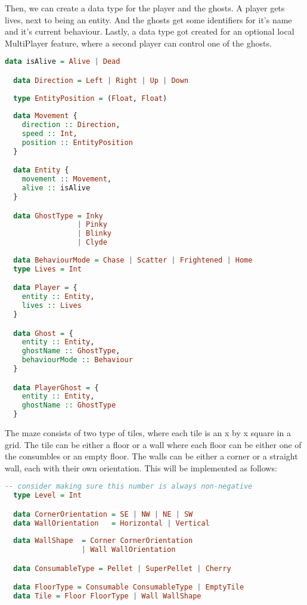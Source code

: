 \documentclass[11pt]{Article}
\begin{document}
Then, we can create a data type for the player and the ghosts. A player gets lives, next to being an entity. And the ghosts get some identifiers for it's name and it's current behaviour. Lastly, a data type got created for an optional local MultiPlayer feature, where a second player can control one of the ghosts.

\begin{lstlisting}[language=Haskell]
  data isAlive = Alive | Dead

  data Direction = Left | Right | Up | Down
  
  type EntityPosition = (Float, Float)
  
  data Movement {
    direction :: Direction,
    speed :: Int,
    position :: EntityPosition
  }

  data Entity {
    movement :: Movement,
    alive :: isAlive
  }

  data GhostType = Inky 
                 | Pinky 
                 | Blinky 
                 | Clyde 
  
  data BehaviourMode = Chase | Scatter | Frightened | Home
  type Lives = Int

  data Player = {
    entity :: Entity,
    lives :: Lives
  }

  data Ghost = {
    entity :: Entity,
    ghostName :: GhostType,
    behaviourMode :: Behaviour
  }

  data PlayerGhost = {
    entity :: Entity,
    ghostName :: GhostType
  }
\end{lstlisting}

\noindent The maze consists of two type of tiles, where each tile is an x by x square in a grid. The tile can be either a floor or a wall where each floor can be either one of the consumbles or an empty floor. The walls can be either a corner or a straight wall, each with their own orientation. This will be implemented as follows:
\begin{lstlisting}[language=Haskell]
  -- consider making sure this number is always non-negative
  type Level = Int

  data CornerOrientation = SE | NW | NE | SW
  data WallOrientation   = Horizontal | Vertical
  
  data WallShape  = Corner CornerOrientation
                  | Wall WallOrientation 

  data ConsumableType = Pellet | SuperPellet | Cherry

  data FloorType = Consumable ConsumableType | EmptyTile
  data Tile = Floor FloorType | Wall WallShape
\end{lstlisting}
\end{document}
